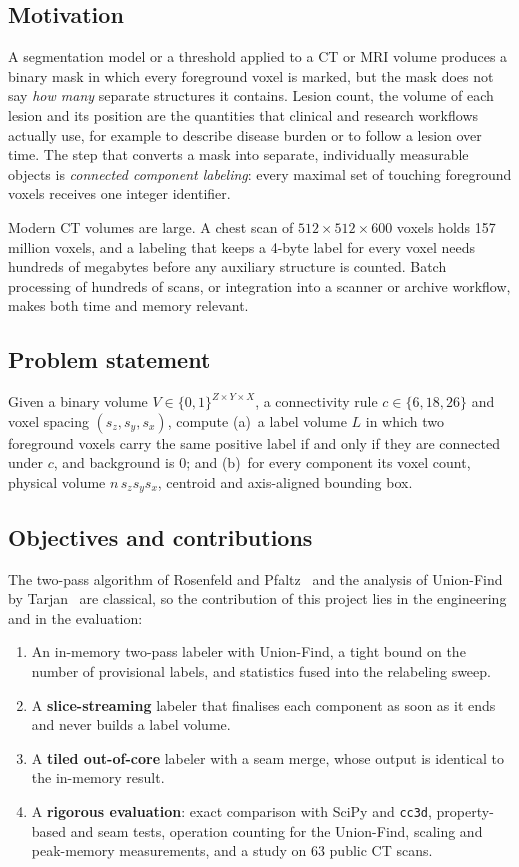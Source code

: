 \documentclass[11pt,a4paper]{article}
\begin{document}
\subsection{Motivation}
A segmentation model or a threshold applied to a CT or MRI volume produces a binary mask in which every foreground voxel is marked, but the mask does not say \emph{how many} separate structures it contains. Lesion count, the volume of each lesion and its position are the quantities that clinical and research workflows actually use, for example to describe disease burden or to follow a lesion over time. The step that converts a mask into separate, individually measurable objects is \emph{connected component labeling}: every maximal set of touching foreground voxels receives one integer identifier.

Modern CT volumes are large. A chest scan of $512\times512\times600$ voxels holds 157 million voxels, and a labeling that keeps a 4-byte label for every voxel needs hundreds of megabytes before any auxiliary structure is counted. Batch processing of hundreds of scans, or integration into a scanner or archive workflow, makes both time and memory relevant.

\subsection{Problem statement}
Given a binary volume $V\in\{0,1\}^{Z\times Y\times X}$, a connectivity rule $c\in\{6,18,26\}$ and voxel spacing $(s_z,s_y,s_x)$, compute (a)~a label volume $L$ in which two foreground voxels carry the same positive label if and only if they are connected under $c$, and background is $0$; and (b)~for every component its voxel count, physical volume $n\,s_z s_y s_x$, centroid and axis-aligned bounding box.

\subsection{Objectives and contributions}
The two-pass algorithm of Rosenfeld and Pfaltz~\cite{rosenfeld1966} and the analysis of Union-Find by Tarjan~\cite{tarjan1975} are classical, so the contribution of this project lies in the engineering and in the evaluation:
\begin{enumerate}
  \item An in-memory two-pass labeler with Union-Find, a tight bound on the number of provisional labels, and statistics fused into the relabeling sweep.
  \item A \textbf{slice-streaming} labeler that finalises each component as soon as it ends and never builds a label volume.
  \item A \textbf{tiled out-of-core} labeler with a seam merge, whose output is identical to the in-memory result.
  \item A \textbf{rigorous evaluation}: exact comparison with SciPy and \texttt{cc3d}, property-based and seam tests, operation counting for the Union-Find, scaling and peak-memory measurements, and a study on 63 public CT scans.
\end{enumerate}
\end{document}
